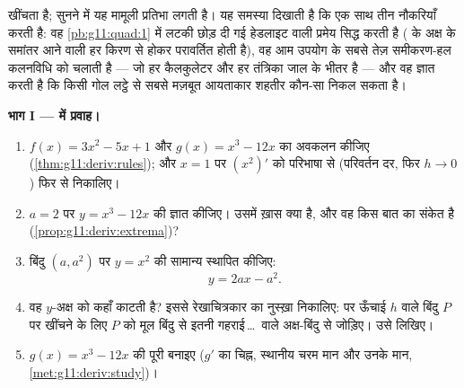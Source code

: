 \begin{problem}
\label{pb:g11:deriv:1}
  खींचता है; सुनने में यह मामूली प्रतिभा लगती है। यह समस्या
दिखाती है कि  एक साथ तीन नौकरियाँ करती है: वह \cref{pb:g11:quad:1} में लटकी छोड़
दी गई हेडलाइट वाली प्रमेय सिद्ध करती है ( के अक्ष के समांतर आने वाली हर
किरण  से होकर परावर्तित होती है), वह आम उपयोग के सबसे तेज़ समीकरण-हल
कलनविधि को चलाती है --- जो हर कैलकुलेटर और हर तंत्रिका जाल के भीतर है --- और
वह ज्ञात करती है कि किसी गोल लट्ठे से सबसे मज़बूत आयताकार शहतीर कौन-सा निकल
सकता है।

\medskip
\noindent\textbf{भाग I ---  में प्रवाह।}
\begin{enumerate}
  \item $f(x) = 3x^2 - 5x + 1$ और $g(x) = x^3 - 12x$ का अवकलन कीजिए (\cref{thm:g11:deriv:rules}); और $x = 1$ पर $\left(x^2
        \right)'$ को
        परिभाषा से (परिवर्तन दर, फिर $h \to 0$) फिर से निकालिए।
  \item $a = 2$ पर $y = x^3 - 12x$ की  ज्ञात कीजिए। उसमें ख़ास क्या है, और
        वह किस बात का संकेत है (\cref{prop:g11:deriv:extrema})?
  \item बिंदु $(a, a^2)$ पर  $y = x^2$ की सामान्य  स्थापित कीजिए:
        \[
        y = 2ax - a^2 .
        \]
  \item वह  $y$-अक्ष को कहाँ काटती है? इससे रेखाचित्रकार का
        नुस्ख़ा निकालिए:  पर ऊँचाई $h$ वाले बिंदु $P$ पर  खींचने के लिए $P$ को मूल बिंदु से इतनी गहराई\,\dots\ वाले
        अक्ष-बिंदु से जोड़िए। उसे लिखिए।
  \item $g(x) = x^3 - 12x$ की पूरी  बनाइए ($g'$ का चिह्न, स्थानीय चरम मान
        और उनके मान, \cref{met:g11:deriv:study})।
\end{enumerate}


\end{problem}
